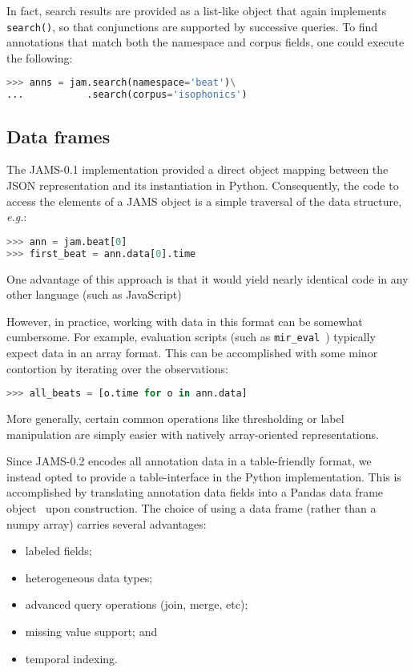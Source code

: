 \documentclass{article}
\begin{document}
In fact, search results are provided as a list-like object that again implements 
\texttt{search()}, so that conjunctions are supported by successive queries.
To find annotations that match both the namespace and corpus fields, one could execute 
the following:
\begin{lstlisting}[language=python]
>>> anns = jam.search(namespace='beat')\
...           .search(corpus='isophonics')
\end{lstlisting}


\subsection{Data frames}\label{sec:imp:dataframe}
The JAMS-0.1 implementation provided a direct object mapping between the JSON representation
and its instantiation in Python.
Consequently, the code to access the elements of a JAMS object is a simple traversal of the
data structure, \emph{e.g.}:
\begin{lstlisting}[language=python]
>>> ann = jam.beat[0]
>>> first_beat = ann.data[0].time
\end{lstlisting}
One advantage of this approach is that it would yield nearly identical code in any other
language (such as JavaScript)

However, in practice, working with data in this format can be somewhat cumbersome.
For example, evaluation scripts (such as \texttt{mir\_eval}~\cite{raffel2014}) typically expect
data in an array format.  This can be accomplished with some minor contortion by
iterating over the observations:
\begin{lstlisting}[language=python]
>>> all_beats = [o.time for o in ann.data]
\end{lstlisting}
More generally, certain common operations like thresholding or
label manipulation are simply easier with natively array-oriented representations.

Since JAMS-0.2 encodes all annotation data in a table-friendly format, we instead opted to
provide a table-interface in the Python implementation.  This is accomplished by
translating annotation data fields into a Pandas data frame
object~\cite{mckinney-proc-scipy-2010} upon construction.
The choice of using a data frame (rather than a numpy array) carries several advantages:
\begin{itemize}
    \setlength\itemsep{0em}
    \item labeled fields;
    \item heterogeneous data types;
    \item advanced query operations (join, merge, etc);
    \item missing value support; and
    \item temporal indexing.
\end{itemize}
\end{document}
